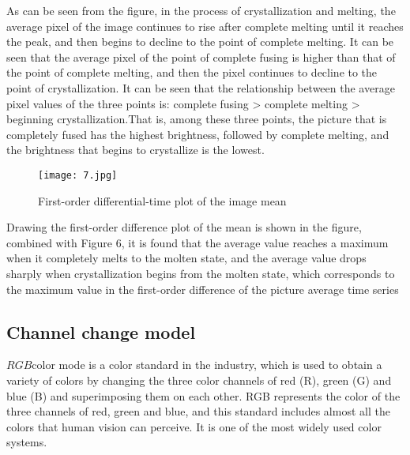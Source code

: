 \documentclass[12pt]{apmcmthesis}
\begin{document}
As can be seen from the figure, in the process of crystallization and melting, the average pixel of the image continues to rise after complete melting until it reaches the peak, and then begins to decline to the point of complete melting. It can be seen that the average pixel of the point of complete fusing is higher than that of the point of complete melting, and then the pixel continues to decline to the point of crystallization.
It can be seen that the relationship between the average pixel values of the three points is: complete fusing > complete melting > beginning crystallization.That is, among these three points, the picture that is completely fused has the highest brightness, followed by complete melting, and the brightness that begins to crystallize is the lowest.


\begin{figure}[htbp]
	\centering
	\texttt{[image: 7.jpg]}
	\caption{First-order differential-time plot of the image mean}
	\label{a}
\end{figure}
Drawing the first-order difference plot of the mean is shown in the figure, combined with Figure 6, it is found that the average value reaches a maximum when it completely melts to the molten state, and the average value drops sharply when crystallization begins from the molten state, which corresponds to the maximum value in the first-order difference of the picture average time series

\subsection{Channel change model}
$ RGB $color mode is a color standard in the industry, which is used to obtain a variety of colors by changing the three color channels of red (R), green (G) and blue (B) and superimposing them on each other. RGB represents the color of the three channels of red, green and blue, and this standard includes almost all the colors that human vision can perceive. It is one of the most widely used color systems.
\end{document}
